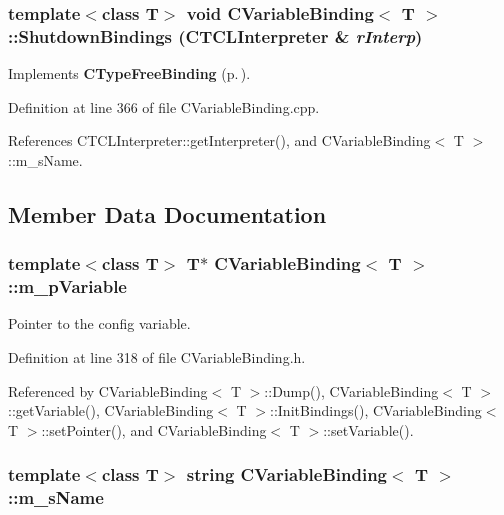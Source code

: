 \subsubsection{\setlength{\rightskip}{0pt plus 5cm}template$<$class T$>$ void CVariable\-Binding$<$ T $>$::Shutdown\-Bindings ({\bf CTCLInterpreter} \& {\em r\-Interp})\hspace{0.3cm}{\tt  [virtual]}}\label{classCVariableBinding_a15}




Implements {\bf CType\-Free\-Binding} {\rm (p.\,\pageref{classCTypeFreeBinding_a2})}.

Definition at line 366 of file CVariable\-Binding.cpp.

References CTCLInterpreter::get\-Interpreter(), and CVariable\-Binding$<$ T $>$::m\_\-s\-Name.

\subsection{Member Data Documentation}
\subsubsection{\setlength{\rightskip}{0pt plus 5cm}template$<$class T$>$ T$\ast$ CVariable\-Binding$<$ T $>$::m\_\-p\-Variable\hspace{0.3cm}{\tt  [private]}}\label{classCVariableBinding_o0}


Pointer to the config variable.



Definition at line 318 of file CVariable\-Binding.h.

Referenced by CVariable\-Binding$<$ T $>$::Dump(), CVariable\-Binding$<$ T $>$::get\-Variable(), CVariable\-Binding$<$ T $>$::Init\-Bindings(), CVariable\-Binding$<$ T $>$::set\-Pointer(), and CVariable\-Binding$<$ T $>$::set\-Variable().
\subsubsection{\setlength{\rightskip}{0pt plus 5cm}template$<$class T$>$ string CVariable\-Binding$<$ T $>$::m\_\-s\-Name\hspace{0.3cm}{\tt  [private]}}\label{classCVariableBinding_o1}


